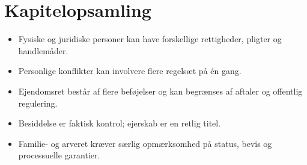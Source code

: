 
\section*{Kapitelopsamling}
\begin{itemize}
  \item Fysiske og juridiske personer kan have forskellige rettigheder, pligter og handlemåder.
  \item Personlige konflikter kan involvere flere regelsæt på én gang.
  \item Ejendomsret består af flere beføjelser og kan begrænses af aftaler og offentlig regulering.
  \item Besiddelse er faktisk kontrol; ejerskab er en retlig titel.
  \item Familie- og arveret kræver særlig opmærksomhed på status, bevis og processuelle garantier.
\end{itemize}
